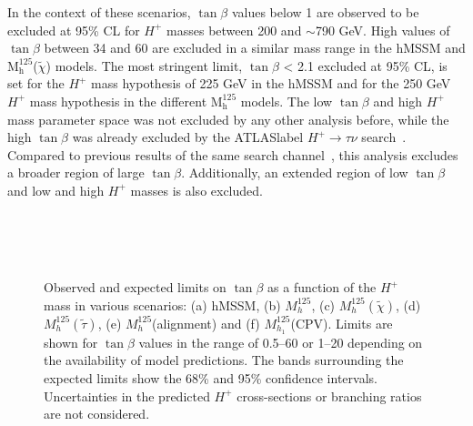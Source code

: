 In the context of these scenarios, $\tan\beta$ values below 1 are observed to be excluded at 95\% CL for $H^+$ masses between 200 and $\sim$790 GeV. High values of $\tan\beta$ between 34 and 60 are excluded in a similar mass range in the hMSSM and $\text{M}^{125}_\text{h}$($\tilde{\chi}$) models. The most stringent limit, $\tan\beta$ < 2.1 excluded at 95\% CL, is set for the $H^+$ mass hypothesis of 225 GeV in the hMSSM and for the 250 GeV $H^+$ mass hypothesis in the different $\text{M}^{125}_\text{h}$ models. The low $\tan\beta$ and high $H^+$ mass parameter space was not excluded by any other analysis before, while the high $\tan\beta$ was already excluded by the \acrshort{ATLASlabel} $H^+\to\tau\nu$ search~\cite{Hplustaunu16}.\\

Compared to previous results of the same search channel~\cite{ATLASHptb2018}, this analysis excludes a broader region of large $\tan\beta$. Additionally, an extended region of low $\tan\beta$ and low and high $H^+$ masses is also excluded.

\begin{figure}[htb]
    \RawFloats
    \centering
        \\
        \\
        \\
    \caption{Observed and expected limits on $\tan\beta$ as a function of the $H^+$ mass in various scenarios: 
    (a) hMSSM, (b) $M_h^{125}$, (c) $M_h^{125}(\tilde{\chi})$, (d) $M_h^{125}(\tilde\tau)$, (e) $M_h^{125}$(alignment) and (f) $M_{h_1}^{125}$(CPV). 
    Limits are shown for $\tan\beta$ values in the range of 0.5--60 or 1--20 depending on the availability of model predictions. The bands surrounding the expected limits show the 68\% and 95\% confidence intervals.
    Uncertainties in the predicted $H^+$ cross-sections or branching ratios are not considered.}
    \label{Hplustb:exclusionstanb}
\end{figure}

